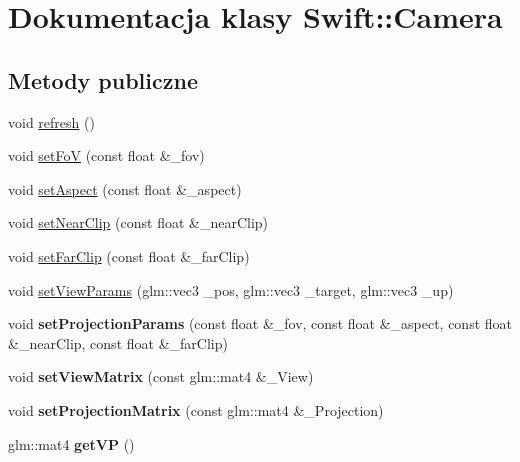 \hypertarget{class_swift_1_1_camera}{\section{Dokumentacja klasy Swift\-:\-:Camera}
\label{class_swift_1_1_camera}
}
\subsection*{Metody publiczne}
\begin{DoxyCompactItemize}
\item 
void \hyperlink{class_swift_1_1_camera_a1deb0323f01dc0f4f4c8339a7f08ccec}{refresh} ()
\item 
void \hyperlink{class_swift_1_1_camera_afbf0a7b7684200d7535fb21af76f4d0f}{set\-Fo\-V} (const float \&\-\_\-fov)
\item 
void \hyperlink{class_swift_1_1_camera_aec504f41e362e79dfee84fb9dd21afff}{set\-Aspect} (const float \&\-\_\-aspect)
\item 
void \hyperlink{class_swift_1_1_camera_a67e483588f775f2cc1a8d95edd7098d1}{set\-Near\-Clip} (const float \&\-\_\-near\-Clip)
\item 
void \hyperlink{class_swift_1_1_camera_af55fb7e3056753e91e6663c19c535907}{set\-Far\-Clip} (const float \&\-\_\-far\-Clip)
\item 
void \hyperlink{class_swift_1_1_camera_adef87453165bf6a77e75473572ffd123}{set\-View\-Params} (glm\-::vec3 \-\_\-pos, glm\-::vec3 \-\_\-target, glm\-::vec3 \-\_\-up)
\item 
\hypertarget{class_swift_1_1_camera_a5ab2155a81e1e71cfe0d0a2eec613327}{void {\bfseries set\-Projection\-Params} (const float \&\-\_\-fov, const float \&\-\_\-aspect, const float \&\-\_\-near\-Clip, const float \&\-\_\-far\-Clip)}\label{class_swift_1_1_camera_a5ab2155a81e1e71cfe0d0a2eec613327}

\item 
\hypertarget{class_swift_1_1_camera_a63ebeba2a56eb6e1e71294b902d08aef}{void {\bfseries set\-View\-Matrix} (const glm\-::mat4 \&\-\_\-\-View)}\label{class_swift_1_1_camera_a63ebeba2a56eb6e1e71294b902d08aef}

\item 
\hypertarget{class_swift_1_1_camera_a29e1b6b95af09c1fa6d4525ddad561ff}{void {\bfseries set\-Projection\-Matrix} (const glm\-::mat4 \&\-\_\-\-Projection)}\label{class_swift_1_1_camera_a29e1b6b95af09c1fa6d4525ddad561ff}

\item 
\hypertarget{class_swift_1_1_camera_a14de6f59dab7997977103ab497668e9a}{glm\-::mat4 {\bfseries get\-V\-P} ()}\label{class_swift_1_1_camera_a14de6f59dab7997977103ab497668e9a}


\end{DoxyCompactItemize}
